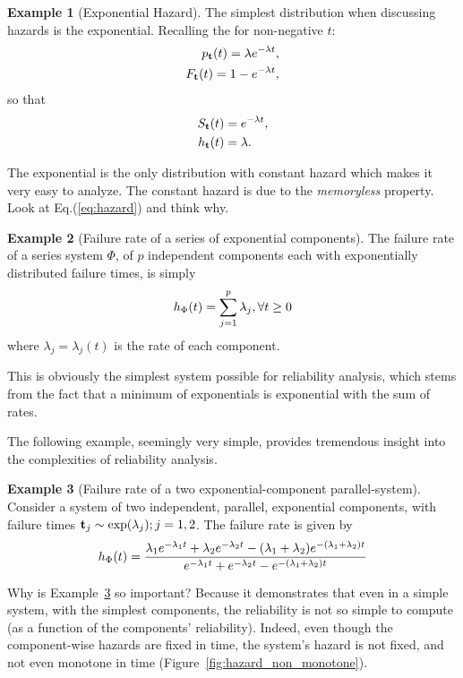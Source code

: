 \documentclass[12pt,a4paper]{report}
\theoremstyle{plain}
\theoremstyle{definition}
\newtheorem{example}{Example}
\newcommand{\exppdf}[2]{#1 e^{-#1 #2}}
\newcommand{\expcdf}[2]{e^{-#1 #2}}
\begin{document}
\begin{example}[Exponential Hazard]
The simplest distribution when discussing hazards is the exponential.
Recalling the for non-negative $t$:
\begin{align}
	p_{\mathbf{t}} (t)= \lambda e^{-\lambda t}, \\
	F_{\mathbf{t}} (t)= 1-e^{-\lambda t},
\end{align}
so that 
\begin{align}
	S_{\mathbf{t}} (t) &= e^{-\lambda t}, \\
	h_{\mathbf{t}} (t) &= \lambda.
\end{align}
\end{example}
The exponential is the only distribution with constant hazard which makes it very easy to analyze.
The constant hazard is due to the \emph{memoryless} property. Look at Eq.(\ref{eq:hazard}) and think why.



\begin{example}[Failure rate of a series of exponential components]
The failure rate of a series system $\Phi$, of $p$ independent components each with exponentially distributed failure times, is simply 
\begin{align}
	h_{\Phi} (t)= \sum_{j=1}^{p} \lambda_j, \forall t \geq 0
\end{align}
where $\lambda_j=\lambda_j(t)$ is the rate of each component.
\end{example}
This is obviously the simplest system possible for reliability analysis, which stems from the fact that a minimum of exponentials is exponential with the sum of rates.



The following example, seemingly very simple, provides tremendous insight into the complexities of reliability analysis.
\begin{example}[Failure rate of a two exponential-component parallel-system]
\label{eg:failure_parallel}
Consider a system of two independent, parallel, exponential components, with failure times $\mathbf{t}_j\sim \exp(\lambda_j); j=1,2$.
The failure rate is given by
\begin{align}
	\hazard{\Phi}{t}=
	\frac
	{\exppdf{\lambda_1}{t} + \exppdf{\lambda_2}{t}  - \exppdf{(\lambda_1+ \lambda_2)}{t}}
	{\expcdf{\lambda_1}{t} + \expcdf{\lambda_2}{t} - \expcdf{(\lambda_1+ \lambda_2)}{t}}
\end{align}
\end{example}
Why is Example~\ref{eg:failure_parallel} so important?
Because it demonstrates that even in a simple system, with the simplest components, the reliability is not so simple to compute (as a function of the components' reliability). 
Indeed, even though the component-wise hazards are fixed in time, the system's hazard is not fixed, and not even monotone in time (Figure~\ref{fig:hazard_non_monotone}). 
\end{document}
